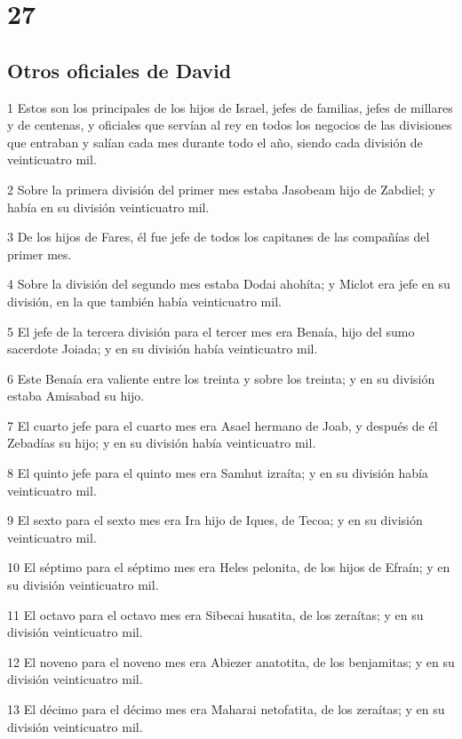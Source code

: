 \chapter{27}

\section*{Otros oficiales de David}

\par 1 Estos son los principales de los hijos de Israel, jefes de familias, jefes de millares y de centenas, y oficiales que servían al rey en todos los negocios de las divisiones que entraban y salían cada mes durante todo el año, siendo cada división de veinticuatro mil.
\par 2 Sobre la primera división del primer mes estaba Jasobeam hijo de Zabdiel; y había en su división veinticuatro mil.
\par 3 De los hijos de Fares, él fue jefe de todos los capitanes de las compañías del primer mes.
\par 4 Sobre la división del segundo mes estaba Dodai ahohíta; y Miclot era jefe en su división, en la que también había veinticuatro mil.
\par 5 El jefe de la tercera división para el tercer mes era Benaía, hijo del sumo sacerdote Joiada; y en su división había veinticuatro mil.
\par 6 Este Benaía era valiente entre los treinta y sobre los treinta; y en su división estaba Amisabad su hijo.
\par 7 El cuarto jefe para el cuarto mes era Asael hermano de Joab, y después de él Zebadías su hijo; y en su división había veinticuatro mil.
\par 8 El quinto jefe para el quinto mes era Samhut izraíta; y en su división había veinticuatro mil.
\par 9 El sexto para el sexto mes era Ira hijo de Iques, de Tecoa; y en su división veinticuatro mil.
\par 10 El séptimo para el séptimo mes era Heles pelonita, de los hijos de Efraín; y en su división veinticuatro mil.
\par 11 El octavo para el octavo mes era Sibecai husatita, de los zeraítas; y en su división veinticuatro mil.
\par 12 El noveno para el noveno mes era Abiezer anatotita, de los benjamitas; y en su división veinticuatro mil.
\par 13 El décimo para el décimo mes era Maharai netofatita, de los zeraítas; y en su división veinticuatro mil.
